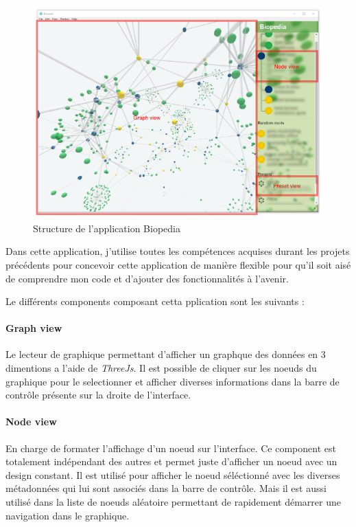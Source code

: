 \begin{figure}[h]
    \centering
    \includegraphics[scale=0.8]{img/biopedia-structure.pdf}
    \caption{Structure de l'application Biopedia}
\end{figure}

Dans cette application, j'utilise toutes les compétences acquises durant les projets précédents pour concevoir cette application de manière flexible pour qu'il soit aisé de comprendre mon code et d'ajouter des fonctionnalités à l'avenir.

\clearpage

Le différents components composant cetta pplication sont les suivants :

\paragraph{Graph view} Le lecteur de graphique permettant d'afficher un graphque des données en 3 dimentions a l'aide de \emph{ThreeJs}.
Il est possible de cliquer sur les noeuds du graphique pour le selectionner et afficher diverses informations dans la barre de contrôle présente sur la droite de l'interface.

\paragraph{Node view} En charge de formater l'affichage d'un noeud sur l'interface.
Ce component est totalement indépendant des autres et permet juste d'afficher un noeud avec un design constant.
Il est utilisé pour afficher le noeud séléctionné avec les diverses métadonnées qui lui sont associés dans la barre de contrôle.
Mais il est aussi utilisé dans la liste de noeuds aléatoire permettant de rapidement démarrer une navigation dans le graphique.

